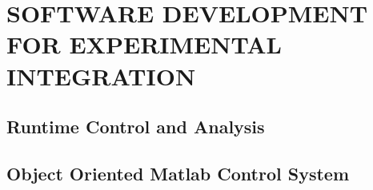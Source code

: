 

\chapter{SOFTWARE DEVELOPMENT FOR EXPERIMENTAL INTEGRATION}
\label{chap:SoftwareDevelopmentforExperimentalIntegration}


\section{Runtime Control and Analysis}
\label{sec:RuntimeControlandAnalysis}


\section{Object Oriented Matlab Control System}
\label{sec:ObjectOrientedMatlabControlSystem}

